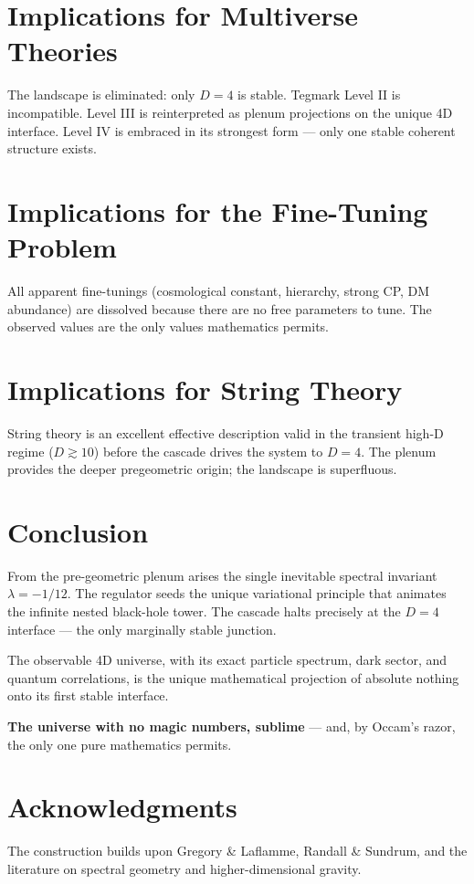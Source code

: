 \documentclass[11pt,a4paper,oneside]{article}
\begin{document}
\section{Implications for Multiverse Theories}
The landscape is eliminated: only $D=4$ is stable. Tegmark Level II is incompatible. Level III is reinterpreted as plenum projections on the unique 4D interface. Level IV is embraced in its strongest form — only one stable coherent structure exists.

\section{Implications for the Fine-Tuning Problem}
All apparent fine-tunings (cosmological constant, hierarchy, strong CP, DM abundance) are dissolved because there are no free parameters to tune. The observed values are the only values mathematics permits.

\section{Implications for String Theory}
String theory is an excellent effective description valid in the transient high-D regime ($D\gtrsim10$) before the cascade drives the system to $D=4$. The plenum provides the deeper pregeometric origin; the landscape is superfluous.

\section{Conclusion}
From the pre-geometric plenum arises the single inevitable spectral invariant $\lambda = -1/12$. The regulator seeds the unique variational principle that animates the infinite nested black-hole tower. The cascade halts precisely at the $D=4$ interface — the only marginally stable junction.

The observable 4D universe, with its exact particle spectrum, dark sector, and quantum correlations, is the unique mathematical projection of absolute nothing onto its first stable interface.

\textbf{The universe with no magic numbers, sublime} — and, by Occam’s razor, the only one pure mathematics permits.

\section*{Acknowledgments}
The construction builds upon Gregory \& Laflamme, Randall \& Sundrum, and the literature on spectral geometry and higher-dimensional gravity.
\end{document}
